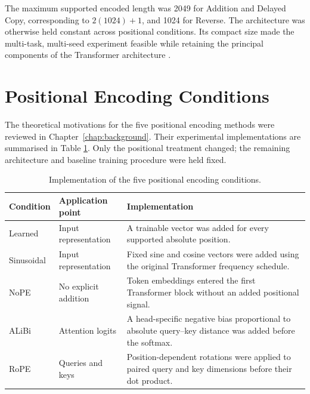 \documentclass[
    author={Aanchala Ravindra Bhongade},
    supervisor={Dr. Fernando Moreno-Pino},
    degree={MSc},
    title={Length Generalisation in Transformer-Based Sequence Models: Failure Taxonomy and Mitigation Strategies},
    subtitle={},
    type={},
    year={2026}
]{dissertation}
\begin{document}
The maximum supported encoded length was 2049 for Addition and Delayed Copy, corresponding to \(2(1024)+1\), and 1024 for Reverse. The architecture was otherwise held constant across positional conditions. Its compact size made the multi-task, multi-seed experiment feasible while retaining the principal components of the Transformer architecture \cite{vaswani2017attention}.

\section{Positional Encoding Conditions}
\label{sec:positional-encoding-variants}

The theoretical motivations for the five positional encoding methods were reviewed in Chapter~\ref{chap:background}. Their experimental implementations are summarised in Table \ref{tab:positional-encodings}. Only the positional treatment changed; the remaining architecture and baseline training procedure were held fixed.

\begin{table}[tbp]
\centering
\small
\renewcommand{\arraystretch}{1.15}
\begin{tabular}{
    p{}
    p{}
    p{}
}
\hline
\textbf{Condition} &
\textbf{Application point} &
\textbf{Implementation} \\
\hline

Learned &
Input representation &
A trainable vector was added for every supported absolute position. \\

Sinusoidal &
Input representation &
Fixed sine and cosine vectors were added using the original Transformer frequency schedule. \\

NoPE &
No explicit addition &
Token embeddings entered the first Transformer block without an added positional signal. \\

ALiBi &
Attention logits &
A head-specific negative bias proportional to absolute query--key distance was added before the softmax. \\

RoPE &
Queries and keys &
Position-dependent rotations were applied to paired query and key dimensions
before their dot product. \\
\hline
\end{tabular}
\caption{Implementation of the five positional encoding conditions.}
\label{tab:positional-encodings}
\end{table}
\end{document}
